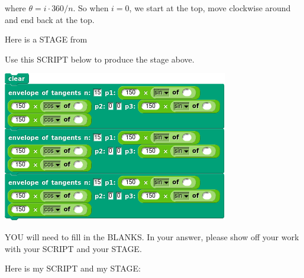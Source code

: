 \documentclass[noauthor,nooutcomes,12pt,hints,handout]{ximera}
\begin{document}
\begin{question}
\begin{freeResponse}
\begin{center}
    \end{center}
    where $\theta = i\cdot 360/n$. So when $i=0$, we start at the top,
    move clockwise around and end back at the top.
  \end{freeResponse}
\end{question}

\mynewpage





\begin{question}
  Here is a STAGE from \snap\
  \begin{center}
  \end{center}
  Use this SCRIPT below to produce the stage above. 
    \begin{center}
    \includegraphics{triEnvScriptBLANK.png}
    \end{center}
    YOU will need to fill in the BLANKS.  In your answer, please show
    off your work with your SCRIPT and your STAGE.
  \begin{freeResponse}
    Here is my SCRIPT and my STAGE:
    \begin{center}

\end{center}
\end{freeResponse}
\end{question}
\end{document}
